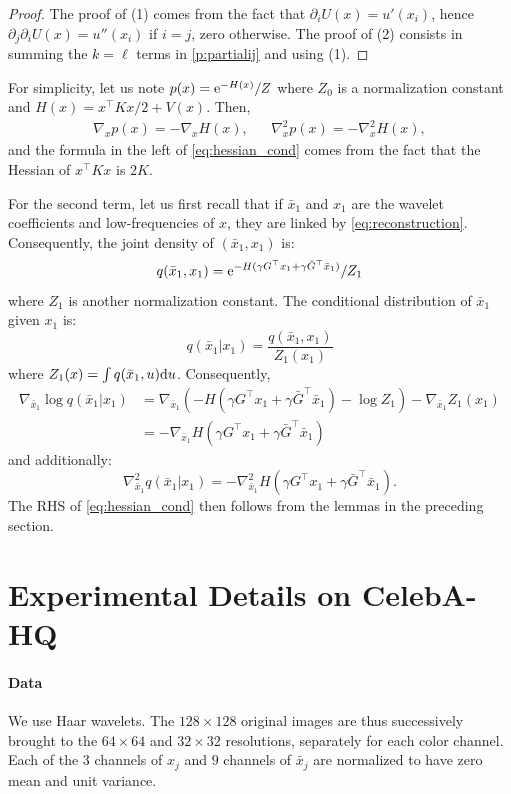 \documentclass{article}
\begin{document}
\begin{proof}
  The proof of (1) comes from the fact that $\partial_i U(x) = u'(x_i)$, hence $\partial_j \partial_i U(x) = u''(x_i)$ if $i=j$, zero otherwise. The proof of (2)  consists in summing the $k=\ell$ terms in \eqref{p:partialij} and using (1). 
\end{proof}



For simplicity, let us note $p(x) = \mathrm{e}^{-H(x)}/Z$ where $Z_0$ is a normalization constant and $H(x) = x^\top K x /2 + V(x)$. Then, 
\begin{align}\nabla_x p(x) = -\nabla_x H(x), && \nabla^2 _x p(x)  = - \nabla^2_x H(x),\end{align}and the formula in the left of \eqref{eq:hessian_cond} comes from the fact that the Hessian of $x^\top K x$ is $2K$. 

For the second term, let us first recall that if $\bar{x}_1$ and $x_1$ are the wavelet coefficients and low-frequencies of $x$, they are linked by \eqref{eq:reconstruction}. Consequently, the joint density of $(\bar{x}_1, x_1)$ is: 
$$ q(\bar{x}_1, x_1) = \mathrm{e}^{-H(\gamma G^\top x_1 + \gamma \bar{G}^\top \bar{x}_1)} / Z_1$$
where $Z_1$ is another normalization constant. The conditional distribution of $\bar{x}_1$ given $x_1$ is: 
$$ q(\bar{x}_1 | x_1) = \frac{q(\bar{x}_1, x_1)}{Z_1(x_1)}$$
where $Z_1(x) = \int q(\bar{x}_1, u)\mathrm{d} u$. Consequently, 
\begin{align} \nabla_{\bar{x}_1} \log q(\bar{x}_1|x_1) &= \nabla_{\bar{x}_1}(-H(\gamma G^\top x_1 + \gamma \bar{G}^\top \bar{x}_1) - \log Z_1) - \nabla_{\bar{x}_1} Z_1(x_1)\\
&= - \nabla_{\bar{x}_1}H(\gamma G^\top x_1 + \gamma \bar{G}^\top \bar{x}_1)
\end{align}
and additionally: 
$$ \nabla^2_{\bar{x}_1}q(\bar{x}_1 | x_1) = - \nabla^2_{\bar{x}_1}H(\gamma G^\top x_1 + \gamma \bar{G}^\top \bar{x}_1). $$
The RHS of \eqref{eq:hessian_cond} then follows from the lemmas in the preceding section. 


\section{Experimental Details on CelebA-HQ}
\label{sec:exper-deta-addit}

\paragraph{Data} We use Haar wavelets. The $128 \times 128$ original images are thus successively brought to the $64 \times 64$ and $32 \times 32$ resolutions, separately for each color channel. Each of the $3$ channels of $x_j$ and $9$ channels of $\bar x_j$ are normalized to have zero mean and unit variance.
\end{document}

